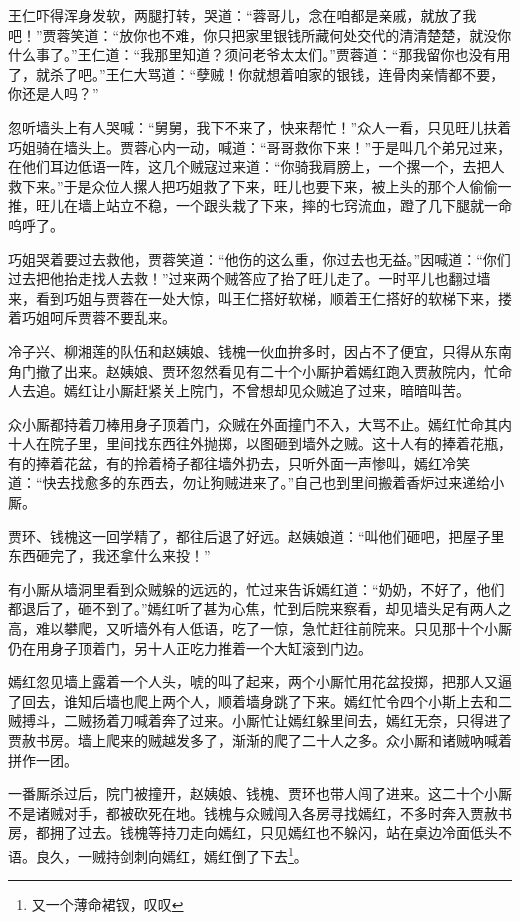 \documentclass[12pt,oneside]{book}
\begin{document}
王仁吓得浑身发软，两腿打转，哭道：“蓉哥儿，念在咱都是亲戚，就放了我吧！”贾蓉笑道：“放你也不难，你只把家里银钱所藏何处交代的清清楚楚，就没你什么事了。”王仁道：“我那里知道？须问老爷太太们。”贾蓉道：“那我留你也没有用了，就杀了吧。”王仁大骂道：“孽贼！你就想着咱家的银钱，连骨肉亲情都不要，你还是人吗？”

忽听墙头上有人哭喊：“舅舅，我下不来了，快来帮忙！”众人一看，只见旺儿扶着巧姐骑在墙头上。贾蓉心内一动，喊道：“哥哥救你下来！”于是叫几个弟兄过来，在他们耳边低语一阵，这几个贼寇过来道：“你骑我肩膀上，一个摞一个，去把人救下来。”于是众位人摞人把巧姐救了下来，旺儿也要下来，被上头的那个人偷偷一推，旺儿在墙上站立不稳，一个跟头栽了下来，摔的七窍流血，蹬了几下腿就一命呜呼了。

巧姐哭着要过去救他，贾蓉笑道：“他伤的这么重，你过去也无益。”因喊道：“你们过去把他抬走找人去救！”过来两个贼答应了抬了旺儿走了。一时平儿也翻过墙来，看到巧姐与贾蓉在一处大惊，叫王仁搭好软梯，顺着王仁搭好的软梯下来，搂着巧姐呵斥贾蓉不要乱来。

冷子兴、柳湘莲的队伍和赵姨娘、钱槐一伙血拚多时，因占不了便宜，只得从东南角门撤了出来。赵姨娘、贾环忽然看见有二十个小厮护着嫣红跑入贾赦院内，忙命人去追。嫣红让小厮赶紧关上院门，不曾想却见众贼追了过来，暗暗叫苦。

众小厮都持着刀棒用身子顶着门，众贼在外面撞门不入，大骂不止。嫣红忙命其内十人在院子里，里间找东西往外抛掷，以图砸到墙外之贼。这十人有的捧着花瓶，有的捧着花盆，有的拎着椅子都往墙外扔去，只听外面一声惨叫，嫣红冷笑道：“快去找愈多的东西去，勿让狗贼进来了。”自己也到里间搬着香炉过来递给小厮。

贾环、钱槐这一回学精了，都往后退了好远。赵姨娘道：“叫他们砸吧，把屋子里东西砸完了，我还拿什么来投！”

有小厮从墙洞里看到众贼躲的远远的，忙过来告诉嫣红道：“奶奶，不好了，他们都退后了，砸不到了。”嫣红听了甚为心焦，忙到后院来察看，却见墙头足有两人之高，难以攀爬，又听墙外有人低语，吃了一惊，急忙赶往前院来。只见那十个小厮仍在用身子顶着门，另十人正吃力推着一个大缸滚到门边。

嫣红忽见墙上露着一个人头，唬的叫了起来，两个小厮忙用花盆投掷，把那人又逼了回去，谁知后墙也爬上两个人，顺着墙身跳了下来。嫣红忙令四个小斯上去和二贼搏斗，二贼扬着刀喊着奔了过来。小厮忙让嫣红躲里间去，嫣红无奈，只得进了贾赦书房。墙上爬来的贼越发多了，渐渐的爬了二十人之多。众小厮和诸贼吶喊着拼作一团。

一番厮杀过后，院门被撞开，赵姨娘、钱槐、贾环也带人闯了进来。这二十个小厮不是诸贼对手，都被砍死在地。钱槐与众贼闯入各房寻找嫣红，不多时奔入贾赦书房，都拥了过去。钱槐等持刀走向嫣红，只见嫣红也不躲闪，站在桌边冷面低头不语。良久，一贼持剑刺向嫣红，嫣红倒了下去\footnote{又一个薄命裙钗，叹叹}。
\end{document}
